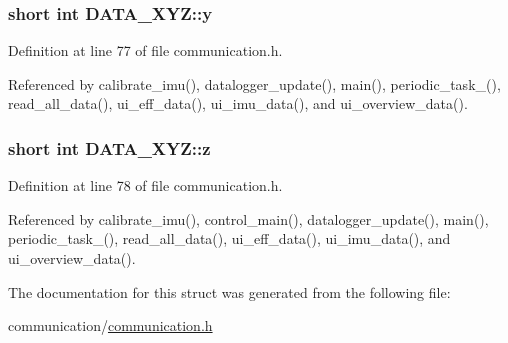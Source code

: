 \hypertarget{structDATA__XYZ_a94bbb1c889bf53eb6a5fffa2b39322cf}{
\subsubsection[{y}]{\setlength{\rightskip}{0pt plus 5cm}short int D\-A\-T\-A\-\_\-\-X\-Y\-Z\-::y}}\label{structDATA__XYZ_a94bbb1c889bf53eb6a5fffa2b39322cf}


Definition at line 77 of file communication.\-h.



Referenced by calibrate\-\_\-imu(), datalogger\-\_\-update(), main(), periodic\-\_\-task\-\_(), read\-\_\-all\-\_\-data(), ui\-\_\-eff\-\_\-data(), ui\-\_\-imu\-\_\-data(), and ui\-\_\-overview\-\_\-data().

\hypertarget{structDATA__XYZ_a69e89ab0ec6e5d72fc5d54f62cc07fb5}{
\subsubsection[{z}]{\setlength{\rightskip}{0pt plus 5cm}short int D\-A\-T\-A\-\_\-\-X\-Y\-Z\-::z}}\label{structDATA__XYZ_a69e89ab0ec6e5d72fc5d54f62cc07fb5}


Definition at line 78 of file communication.\-h.



Referenced by calibrate\-\_\-imu(), control\-\_\-main(), datalogger\-\_\-update(), main(), periodic\-\_\-task\-\_(), read\-\_\-all\-\_\-data(), ui\-\_\-eff\-\_\-data(), ui\-\_\-imu\-\_\-data(), and ui\-\_\-overview\-\_\-data().



The documentation for this struct was generated from the following file\-:\begin{DoxyCompactItemize}
\item 
communication/\hyperlink{communication_2communication_8h}{communication.\-h}\end{DoxyCompactItemize}
